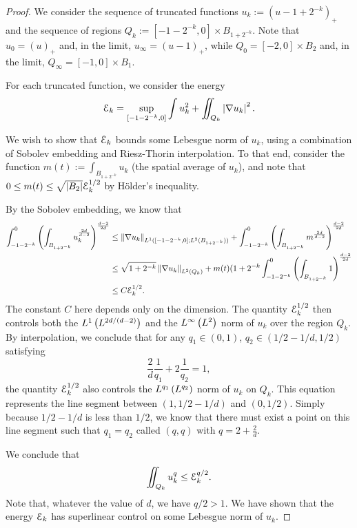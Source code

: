 \begin{proof}
We consider the sequence of truncated functions $u_k := (u-1 + 2^{-k})_+$ and the sequence of regions $Q_k := [-1-2^{-k},0] \times B_{1 + 2^{-k}}$.  Note that $u_0 = (u)_+$ and, in the limit, $u_\infty = (u-1)_+$, while $Q_0 = [-2,0]\times B_2$ and, in the limit, $Q_\infty = [-1,0]\times B_1$. 

For each truncated function, we consider the energy
\[ \mathcal{E}_k = \sup_{[-1-2^{-k},0]} \int u_k^2 + \iint_{Q_k} \left\lvert \nabla u_k \right\rvert^2. \]

We wish to show that $\mathcal{E}_k$ bounds some Lebesgue norm of $u_k$, using a combination of Sobolev embedding and Riesz-Thorin interpolation.  To that end, consider the function $m(t) := \int_{B_{1+2^{-k}}} u_k$ (the spatial average of $u_k$), and note that $0 \leq m(t) \leq \sqrt{|B_2|} \mathcal{E}_k^{1/2}$ by H\"{o}lder's inequality.  

By the Sobolev embedding, we know that 
\begin{align*} 
\int_{-1-2^{-k}}^0 \left(  \int_{B_{1+2^{-k}}} u_k^{\frac{2d}{d-2}}  \right)^{\frac{d-2}{2d}} 
&\leq \left\lVert \nabla u_k\right\rVert_{L^1([-1-2^{-k},0]; L^2(B_{1+2^{-k}}))} + \int_{-1-2^{-k}}^0 \left(  \int_{B_{1+2^{-k}}} m^{\frac{2d}{d-2}}  \right)^{\frac{d-2}{2d}}
\\ &\leq \sqrt{1+2^{-k}} \left\lVert \nabla u_k\right\rVert_{L^2(Q_k)} + m(t) (1+2^{-k}\int_{-1-2^{-k}}^0 \left(  \int_{B_{1+2^{-k}}} 1  \right)^{\frac{d-2}{2d} }
\\ &\leq C \mathcal{E}_k^{1/2}.
\end{align*}
The constant $C$ here depends only on the dimension.  The quantity $\mathcal{E}_k^{1/2}$ then controls both the $L^1\left(  L^{2d/(d-2)}  \right)$ and the $L^\infty\left( L^2 \right)$ norm of $u_k$ over the region $Q_k$.  By interpolation, we conclude that for any $q_1 \in (0,1)$, $q_2 \in (1/2-1/d, 1/2)$ satisfying
\[ \frac{2}{d} \frac{1}{q_1} + 2 \frac{1}{q_2} = 1, \]
the quantity $\mathcal{E}_k^{1/2}$ also controls the $L^{q_1}\left( L^{q_2} \right)$ norm of $u_k$ on $Q_k$.  This equation represents the line segment between $(1,1/2-1/d)$ and $(0,1/2)$.  Simply because $1/2 - 1/d$ is less than $1/2$, we know that there must exist a point on this line segment such that $q_1 = q_2$ called $(q,q)$ with $q = 2 + \frac{2}{d}$.  

We conclude that 
\begin{equation} \label{intro-lower bound on energy E_k}
\iint_{Q_k} u_k^q \leq \mathcal{E}_k^{q/2}. 
\end{equation}
Note that, whatever the value of $d$, we have $q/2 > 1$.  We have shown that the energy $\mathcal{E}_k$ has superlinear control on some Lebesgue norm of $u_k$.  


\end{proof}

